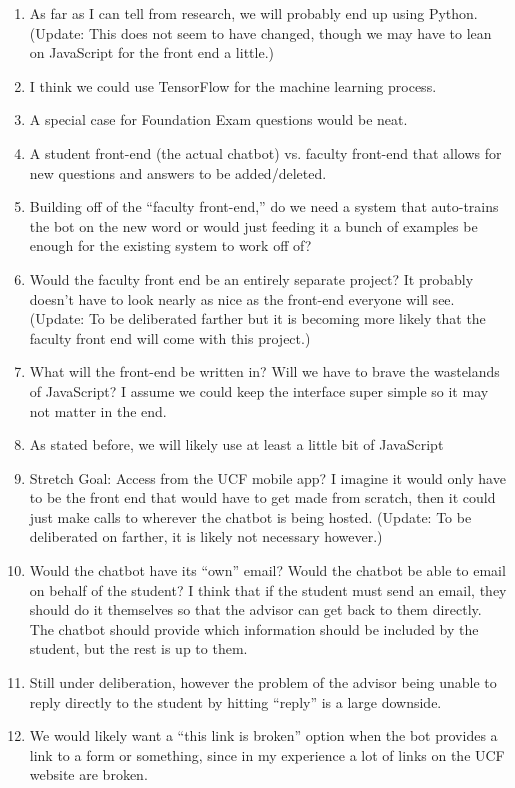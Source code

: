\documentclass[titlepage, 12pt]{article}
\begin{document}
\begin{enumerate}
    \item As far as I can tell from research, we will probably end up using Python. (Update: This does not seem to have changed, though we may have to lean on JavaScript for the front end a little.)
    \item I think we could use TensorFlow for the machine learning process.
    \item A special case for Foundation Exam questions would be neat.
    \item A student front-end (the actual chatbot) vs. faculty front-end that allows for new questions and answers to be added/deleted.
    \item Building off of the “faculty front-end,” do we need a system that auto-trains the bot on the new word or would just feeding it a bunch of examples be enough for the existing system to work off of?
    \item Would the faculty front end be an entirely separate project? It probably doesn’t have to look nearly as nice as the front-end everyone will see. (Update: To be deliberated farther but it is becoming more likely that the faculty front end will come with this project.)
    \item What will the front-end be written in? Will we have to brave the wastelands of JavaScript? I assume we could keep the interface super simple so it may not matter in the end.
    \item As stated before, we will likely use at least a little bit of JavaScript
    \item Stretch Goal: Access from the UCF mobile app? I imagine it would only have to be the front end that would have to get made from scratch, then it could just make calls to wherever the chatbot is being hosted. (Update: To be deliberated on farther, it is likely not necessary however.)
    \item Would the chatbot have its “own” email? Would the chatbot be able to email on behalf of the student? I think that if the student must send an email, they should do it themselves so that the advisor can get back to them directly. The chatbot should provide which information should be included by the student, but the rest is up to them.
    \item Still under deliberation, however the problem of the advisor being unable to reply directly to the student by hitting “reply” is a large downside. 
    \item We would likely want a “this link is broken” option when the bot provides a link to a form or something, since in my experience a lot of links on the UCF website are broken.

\end{enumerate}
\end{document}
